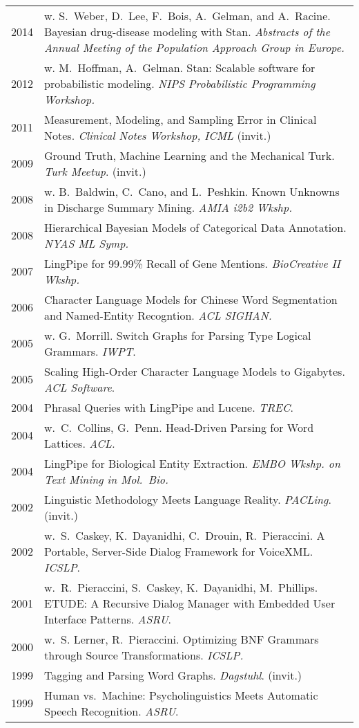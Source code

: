 \documentclass[10pt]{paper}
\newcommand{\heading}[1]{\noindent{\Large\bf\sffamily #1}\\[6pt]}
\newcommand{\publ}[2]{#1 & \begin{minipage}[t]{0.9\textwidth}#2\end{minipage}\\[4pt]}
\begin{document}
\clearpage
\heading{Conference Papers}
\begin{tabular}{ll}
  \publ{2014}{w. S.~Weber, D.~Lee, F.~Bois, A.~Gelman, and
    A.~Racine. Bayesian drug-disease modeling with Stan.
   {\sl\sffamily Abstracts of the Annual Meeting of the
      Population Approach Group in Europe.}\vspace*{6pt}}
\publ{2012}{w. M.~Hoffman, A.~Gelman. Stan: Scalable software for
  probabilistic modeling. {\sl\sffamily NIPS Probabilistic Programming
    Workshop.}\vspace*{6pt}}
\publ{2011}{Measurement, Modeling, and Sampling Error in Clinical
  Notes. {\sl\sffamily Clinical Notes Workshop, ICML} (invit.)}
\publ{2009}{Ground Truth, Machine Learning and the Mechanical
  Turk. {\sl\sffamily Turk Meetup}. (invit.) \vspace*{6pt}}
\publ{2008}{w. B.~Baldwin, C.~Cano, and L.~Peshkin. Known Unknowns in Discharge Summary Mining. {\sl\sffamily AMIA i2b2 Wkshp.}\vspace*{6pt}}
\publ{2008}{Hierarchical Bayesian Models of Categorical Data Annotation. {\sl\sffamily NYAS ML Symp.}}
\publ{2007}{LingPipe for 99.99\% Recall of Gene Mentions. {\sl\sffamily BioCreative II Wkshp.}}
\publ{2006}{Character Language Models for Chinese Word Segmentation and Named-Entity Recogntion. {\sl\sffamily ACL SIGHAN.}}
\publ{2005}{w. G.~Morrill. Switch Graphs for Parsing Type Logical Grammars. {\sl\sffamily IWPT}.}
\publ{2005}{Scaling High-Order Character Language Models to Gigabytes. {\sl\sffamily ACL Software}.}
\publ{2004}{Phrasal Queries with LingPipe and Lucene. {\sl\sffamily TREC}.}
\publ{2004}{w.\ C.~Collins, G.~Penn. Head-Driven Parsing for Word Lattices. {\sl\sffamily ACL.}}
\publ{2004}{LingPipe for Biological Entity Extraction. {\sl\sffamily EMBO Wkshp. on Text Mining in Mol.~Bio.}}
\publ{2002}{Linguistic Methodology Meets Language Reality. {\sl\sffamily PACLing}. (invit.)}
\publ{2002}{w.\ S.~Caskey, K.~Dayanidhi, C.~Drouin, R.~Pieraccini. A Portable, Server-Side Dialog Framework for VoiceXML. {\sl\sffamily ICSLP}.\vspace{8pt}}
\publ{2001}{w.\  R.~Pieraccini, S.~Caskey, K.~Dayanidhi, M.~Phillips. ETUDE: A Recursive Dialog Manager with Embedded User Interface Patterns. {\sl\sffamily ASRU}.\vspace{6pt}}
\publ{2000}{w.\ S. Lerner, R.~Pieraccini. Optimizing BNF Grammars
  through Source Transformations. {\sl\sffamily ICSLP.}}
\publ{1999}{Tagging and Parsing Word Graphs. {\sl\sffamily Dagstuhl}. (invit.)}
\publ{1999}{Human vs.\ Machine: Psycholinguistics Meets Automatic Speech Recognition. {\sl\sffamily ASRU}.}

\end{tabular}
\end{document}
